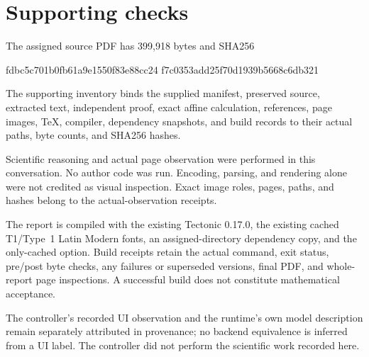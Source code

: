 \documentclass[10pt]{article}
\begin{document}
\section*{Supporting checks}
The assigned source PDF has 399,918 bytes and SHA256\par
fdbc5c701b0fb61a9e1550f83e88cc24
f7c0353add25f70d1939b5668c6db321\par
The supporting inventory binds the supplied manifest, preserved source, extracted text, independent proof, exact affine calculation, references, page images, TeX, compiler, dependency snapshots, and build records to their actual paths, byte counts, and SHA256 hashes.\par
Scientific reasoning and actual page observation were performed in this conversation. No author code was run. Encoding, parsing, and rendering alone were not credited as visual inspection. Exact image roles, pages, paths, and hashes belong to the actual-observation receipts.\par
The report is compiled with the existing Tectonic 0.17.0, the existing cached T1/Type 1 Latin Modern fonts, an assigned-directory dependency copy, and the only-cached option. Build receipts retain the actual command, exit status, pre/post byte checks, any failures or superseded versions, final PDF, and whole-report page inspections. A successful build does not constitute mathematical acceptance.\par
The controller’s recorded UI observation and the runtime’s own model description remain separately attributed in provenance; no backend equivalence is inferred from a UI label. The controller did not perform the scientific work recorded here.\par
\end{document}
